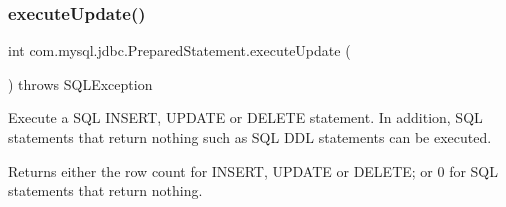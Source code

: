 \subsubsection{\texorpdfstring{execute\+Update()}{executeUpdate()}}
{\footnotesize\ttfamily int com.\+mysql.\+jdbc.\+Prepared\+Statement.\+execute\+Update (\begin{DoxyParamCaption}{ }\end{DoxyParamCaption}) throws S\+Q\+L\+Exception}

Execute a S\+QL I\+N\+S\+E\+RT, U\+P\+D\+A\+TE or D\+E\+L\+E\+TE statement. In addition, S\+QL statements that return nothing such as S\+QL D\+DL statements can be executed.

\begin{DoxyReturn}{Returns}
either the row count for I\+N\+S\+E\+RT, U\+P\+D\+A\+TE or D\+E\+L\+E\+TE; or 0 for S\+QL statements that return nothing.
\end{DoxyReturn}

